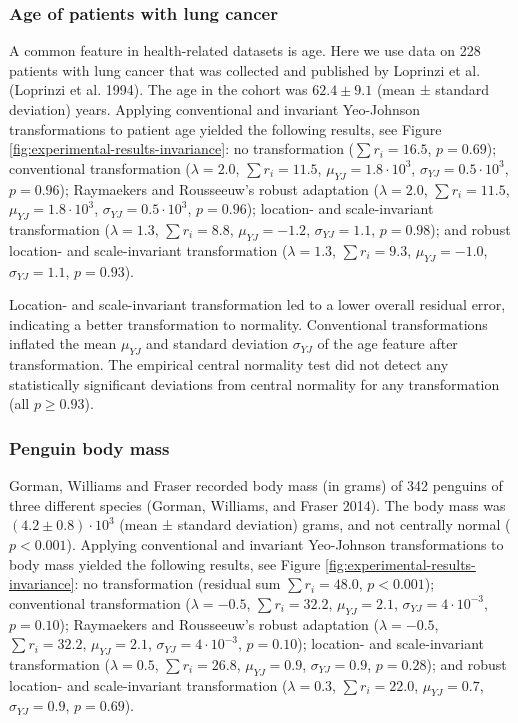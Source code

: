 \documentclass[
  a4paper,
]{article}
\begin{document}
\subsubsection{Age of patients with lung
cancer}\label{age-of-patients-with-lung-cancer}

A common feature in health-related datasets is age. Here we use data on
228 patients with lung cancer that was collected and published by
Loprinzi et al. (Loprinzi et al. 1994). The age in the cohort was
\(62.4 \pm 9.1\) (mean ± standard deviation) years. Applying
conventional and invariant Yeo-Johnson transformations to patient age
yielded the following results, see Figure
\ref{fig:experimental-results-invariance}: no transformation
(\(\sum r_i = 16.5\), \(p = 0.69\)); conventional transformation
(\(\lambda = 2.0\), \(\sum r_i = 11.5\), \(\mu_{YJ} = 1.8 \cdot 10^3\),
\(\sigma_{YJ} = 0.5 \cdot 10^3\), \(p = 0.96\)); Raymaekers and
Rousseeuw's robust adaptation (\(\lambda = 2.0\), \(\sum r_i = 11.5\),
\(\mu_{YJ} = 1.8 \cdot 10^3\), \(\sigma_{YJ} = 0.5 \cdot 10^3\),
\(p = 0.96\)); location- and scale-invariant transformation
(\(\lambda = 1.3\), \(\sum r_i = 8.8\), \(\mu_{YJ} = -1.2\),
\(\sigma_{YJ} = 1.1\), \(p = 0.98\)); and robust location- and
scale-invariant transformation (\(\lambda = 1.3\), \(\sum r_i = 9.3\),
\(\mu_{YJ} = -1.0\), \(\sigma_{YJ} = 1.1\), \(p = 0.93\)).

Location- and scale-invariant transformation led to a lower overall
residual error, indicating a better transformation to normality.
Conventional transformations inflated the mean \(\mu_{YJ}\) and standard
deviation \(\sigma_{YJ}\) of the age feature after transformation. The
empirical central normality test did not detect any statistically
significant deviations from central normality for any transformation
(all \(p \geq 0.93\)).

\subsubsection{Penguin body mass}\label{penguin-body-mass}

Gorman, Williams and Fraser recorded body mass (in grams) of 342
penguins of three different species (Gorman, Williams, and Fraser 2014).
The body mass was \((4.2 \pm 0.8) \cdot 10^3\) (mean ± standard
deviation) grams, and not centrally normal (\(p < 0.001\)). Applying
conventional and invariant Yeo-Johnson transformations to body mass
yielded the following results, see Figure
\ref{fig:experimental-results-invariance}: no transformation (residual
sum \(\sum r_i = 48.0\), \(p < 0.001\)); conventional transformation
(\(\lambda = -0.5\), \(\sum r_i = 32.2\), \(\mu_{YJ} = 2.1\),
\(\sigma_{YJ} = 4 \cdot 10^{-3}\), \(p = 0.10\)); Raymaekers and
Rousseeuw's robust adaptation (\(\lambda = -0.5\), \(\sum r_i = 32.2\),
\(\mu_{YJ} = 2.1\), \(\sigma_{YJ} = 4 \cdot 10^{-3}\), \(p = 0.10\));
location- and scale-invariant transformation (\(\lambda = 0.5\),
\(\sum r_i = 26.8\), \(\mu_{YJ} = 0.9\), \(\sigma_{YJ} = 0.9\),
\(p = 0.28\)); and robust location- and scale-invariant transformation
(\(\lambda = 0.3\), \(\sum r_i = 22.0\), \(\mu_{YJ} = 0.7\),
\(\sigma_{YJ} = 0.9\), \(p = 0.69\)).
\end{document}
